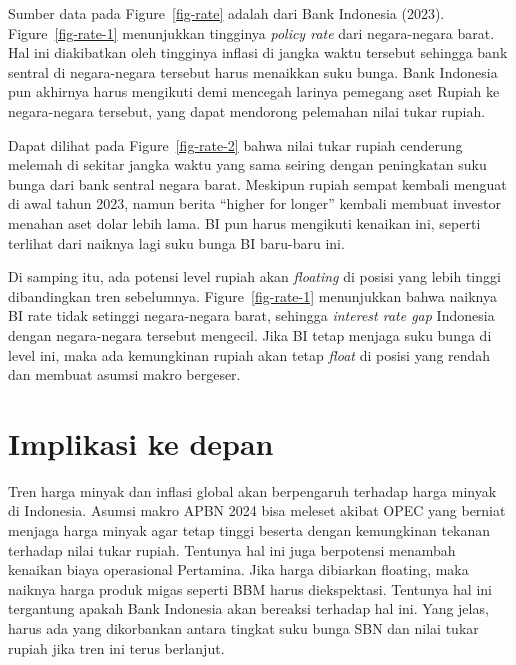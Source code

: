 \documentclass[
  a4paper,
  DIV=11,
  numbers=noendperiod]{scrreprt}
\begin{document}
Sumber data pada Figure~\ref{fig-rate} adalah dari Bank Indonesia
(2023). Figure~\ref{fig-rate-1} menunjukkan tingginya \emph{policy rate}
dari negara-negara barat. Hal ini diakibatkan oleh tingginya inflasi di
jangka waktu tersebut sehingga bank sentral di negara-negara tersebut
harus menaikkan suku bunga. Bank Indonesia pun akhirnya harus mengikuti
demi mencegah larinya pemegang aset Rupiah ke negara-negara tersebut,
yang dapat mendorong pelemahan nilai tukar rupiah.

Dapat dilihat pada Figure~\ref{fig-rate-2} bahwa nilai tukar rupiah
cenderung melemah di sekitar jangka waktu yang sama seiring dengan
peningkatan suku bunga dari bank sentral negara barat. Meskipun rupiah
sempat kembali menguat di awal tahun 2023, namun berita ``higher for
longer'' kembali membuat investor menahan aset dolar lebih lama. BI pun
harus mengikuti kenaikan ini, seperti terlihat dari naiknya lagi suku
bunga BI baru-baru ini.

Di samping itu, ada potensi level rupiah akan \emph{floating} di posisi
yang lebih tinggi dibandingkan tren sebelumnya. Figure~\ref{fig-rate-1}
menunjukkan bahwa naiknya BI rate tidak setinggi negara-negara barat,
sehingga \emph{interest rate gap} Indonesia dengan negara-negara
tersebut mengecil. Jika BI tetap menjaga suku bunga di level ini, maka
ada kemungkinan rupiah akan tetap \emph{float} di posisi yang rendah dan
membuat asumsi makro bergeser.

\hypertarget{implikasi-ke-depan}{%
\section{Implikasi ke depan}\label{implikasi-ke-depan}}

Tren harga minyak dan inflasi global akan berpengaruh terhadap harga
minyak di Indonesia. Asumsi makro APBN 2024 bisa meleset akibat OPEC
yang berniat menjaga harga minyak agar tetap tinggi beserta dengan
kemungkinan tekanan terhadap nilai tukar rupiah. Tentunya hal ini juga
berpotensi menambah kenaikan biaya operasional Pertamina. Jika harga
dibiarkan floating, maka naiknya harga produk migas seperti BBM harus
diekspektasi. Tentunya hal ini tergantung apakah Bank Indonesia akan
bereaksi terhadap hal ini. Yang jelas, harus ada yang dikorbankan antara
tingkat suku bunga SBN dan nilai tukar rupiah jika tren ini terus
berlanjut.
\end{document}
